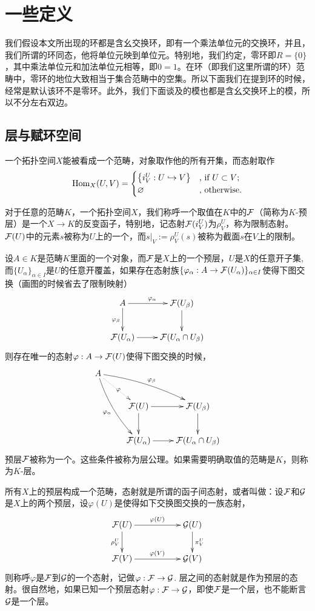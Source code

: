 \renewcommand\chapterimg{Pictures/7.png}
\chapter{一些定义}

我们假设本文所出现的环都是含幺交换环，即有一个乘法单位元的交换环，并且，我们所谓的环同态，他将单位元映到单位元。特别地，我们约定，零环即$R=\{0\}$，其中乘法单位元和加法单位元相等，即$0=1$。在环（即我们这里所谓的环）范畴中，零环的地位大致相当于集合范畴中的空集。所以下面我们在提到环的时候，经常是默认该环不是零环。此外，我们下面谈及的模也都是含幺交换环上的模，所以不分左右双边。

\section{层与赋环空间}

\para 一个拓扑空间$X$能被看成一个范畴，对象取作他的所有开集，而态射取作
\[
	\operatorname{Hom}_{X}(U,V)=\begin{cases}
	\bigl\{i^U_V:U\hookrightarrow V\bigr\}&\text{, if }U\subset V\text{;}\\
	\varnothing&\text{, otherwise}.
	\end{cases}
\]

\para 对于任意的范畴$K$，一个拓扑空间$X$，我们称呼一个取值在$K$中的$\mathcal{F}$（简称为$K$-预层）是一个$X\to K$的反变函子，特别地，记态射$\mathcal{F}(i^U_V)$为$\rho^U_V$，称为限制态射。 $\mathcal{F}(U)$中的元素$s$被称为$U$上的一个，而$s|_V:=\rho^U_V(s)$被称为截面$s$在$V$上的限制。

\para 设$A\in K$是范畴$K$里面的一个对象，而$\mathcal{F}$是$X$上的一个预层，$U$是$X$的任意开子集, 而$\{U_\alpha\}_{\alpha\in I}$是$U$的任意开覆盖，如果存在态射族$\{\varphi_\alpha:A\to \mathcal{F}(U_\alpha)\}_{\alpha\in I}$使得下图交换（画图的时候省去了限制映射）
\[
	\xymatrix{
		A\ar[r]^{\varphi_{\alpha}}\ar[d]_{\varphi_{\beta}}&\calf(U_\beta)\ar[d]\\
		\calf(U_\alpha)\ar[r]&\calf(U_{\alpha}\cap U_{\beta})
	}
\]
则存在唯一的态射$\varphi:A\to \mathcal{F}(U)$使得下图交换的时候，
\[
	\xymatrix{
		A\ar@/_/[ddr]_{\varphi_{\alpha}}\ar@/^/[drr]^{\varphi_{\beta}}\ar@{.>}[dr]|{\varphi}&& \\
		&\calf(U)\ar[r]\ar[d]&\calf(U_\beta)\ar[d]\\
		&\calf(U_\alpha)\ar[r]&\calf(U_{\alpha}\cap U_{\beta})
	}
\]
预层$\mathcal{F}$被称为一个。这些条件被称为层公理。如果需要明确取值的范畴是$K$，则称为$K$-层。

\para 所有$X$上的预层构成一个范畴，态射就是所谓的函子间态射，或者叫做：设$\mathcal{F}$和$\mathcal{G}$是$X$上的两个预层，设$\varphi(U)$是使得如下交换图交换的一族态射，
\[
	\xymatrix{
		\calf(U)\ar[rr]^{\varphi(U)} \ar[d]_{\rho^U_V}&&\calg(U) \ar[d]^{\pi^U_V}\\
		\calf(V)\ar[rr]^{\varphi(V)}&&\calg(V)
	}
\]
则称呼$\varphi$是$\mathcal{F}$到$\mathcal{G}$的一个态射，记做$\varphi:\mathcal{F}\to\mathcal{G}$. 层之间的态射就是作为预层的态射。很自然地，如果已知一个预层态射$\varphi:\mathcal{F}\to\mathcal{G}$，即使$\mathcal{F}$是一个层，也不能断言$\mathcal{G}$是一个层。

